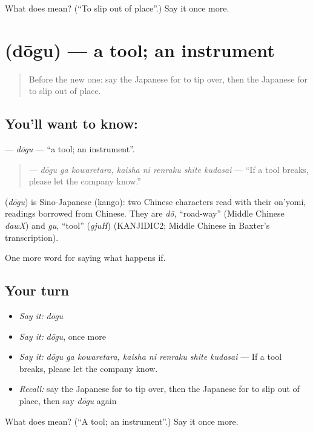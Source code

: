 \begin{tcolorbox}[breakable,colback=teal!4,colframe=teal!35!black,title={Before you move on}]
What does  mean? (\textquotedblleft{}To slip out of place\textquotedblright{}.) Say it once more.
\end{tcolorbox}
\section[\texorpdfstring{\ja{どうぐ} (dōgu)}{どうぐ (dōgu)}]{ (dōgu) — a tool; an instrument}

\label{lesson:JA-C352-dougu}



\begin{quote}
Before the new one: say the Japanese for to tip over, then the Japanese for to slip out of place.
\end{quote}

\subsection*{You'll want to know: }
\textbf{} — \emph{dōgu} — \textquotedblleft{}a tool; an instrument\textquotedblright{}.

\begin{quote}
\textbf{   } — \emph{dōgu ga kowaretara, kaisha ni renraku shite kudasai} — \textquotedblleft{}If a tool breaks, please let the company know.\textquotedblright{}
\end{quote}

\begin{cousinweb}
\textbf{} (\emph{dōgu}) is Sino-Japanese (kango): two Chinese characters read with their on'yomi, readings borrowed from Chinese. They are \emph{dō}, \textquotedblleft{}road-way\textquotedblright{} (Middle Chinese \emph{dawX}) and \emph{gu}, \textquotedblleft{}tool\textquotedblright{} (\emph{gjuH}) (KANJIDIC2; Middle Chinese in Baxter's transcription).
\end{cousinweb}

\begin{grammarlens}[title={What you've built}]
One more word for saying what happens if.
\end{grammarlens}

\subsection*{Your turn}
\begin{itemize}
\raggedright
  \item \emph{Say it:} \emph{dōgu}
  \item \emph{Say it:} \emph{dōgu}, once more
  \item \emph{Say it:} \emph{dōgu ga kowaretara, kaisha ni renraku shite kudasai} — If a tool breaks, please let the company know.
  \item \emph{Recall:} say the Japanese for to tip over, then the Japanese for to slip out of place, then say \emph{dōgu} again
\end{itemize}

\begin{tcolorbox}[breakable,colback=teal!4,colframe=teal!35!black,title={Before you move on}]
What does  mean? (\textquotedblleft{}A tool; an instrument\textquotedblright{}.) Say it once more.
\end{tcolorbox}
